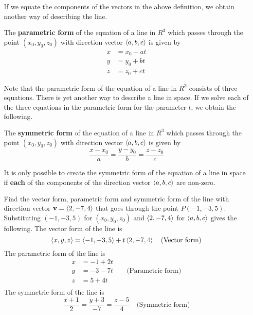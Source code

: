 \documentclass[handout]{ximera}
\begin{document}
If we equate the components of the vectors in the above definition, we obtain another way of describing the line.

\begin{definition}
The \textbf{parametric form} of the equation of a line in $R^3$ which passes through the point $(x_0, y_0, z_0)$ with 
direction vector $\left\langle a, b, c\right\rangle$ is given by
\begin{align*}
x &= x_0 + at\\
y &= y_0 + bt\\
z &= z_0 + ct
\end{align*}
\end{definition}
Note that the parametric form of the equation of a line in $R^3$ consists of three equations.
There is yet another way to describe a line in space. If we solve each of the three equations in the parametric form for the parameter $t$, 
we obtain the following.
\begin{definition}
The \textbf{symmetric form} of the equation of a line in $R^3$ which passes through the point $(x_0, y_0, z_0)$ with 
direction vector $\left\langle a, b, c\right\rangle$ is given by
\[
\frac{x-x_0}{a} = \frac{y-y_0}{b} = \frac{z-z_0}{c}
\]
\end{definition}
\begin{remark}
It is only possible to create the symmetric form of the equation of a line in space if \textbf{each} of the components of 
the direction vector $\left\langle a, b, c\right\rangle$ are non-zero.
\end{remark}


\begin{example}[Example 1]
Find the vector form, parametric form and symmetric form of the line with direction 
vector $\mathbf{v} = \left\langle 2, -7, 4\right\rangle$ that goes through the point $P(-1, -3, 5)$. \\
Substituting $(-1, -3, 5)$ for $(x_0, y_0, z_0)$ and $\left\langle 2, -7, 4\right\rangle$ for $\left\langle a,b,c\right\rangle$ gives the following.
The vector form of the line is 
\[
\left\langle x, y, z\right\rangle = \left\langle -1, -3, 5\right\rangle + t\left\langle 2, -7, 4\right\rangle \quad \text{(Vector form)}
\]
The parametric form of the line is
\begin{align*}
x &= -1 +2t\\
y &= -3 -7t \quad\quad \text{(Parametric form)}\\
z &= 5 + 4t\\
\end{align*}
The symmetric form of the line is
\[
\frac{x+1}{2} = \frac{y+3}{-7} = \frac{z-5}{4} \quad \text{(Symmetric form)}
\]
\end{example}
\end{document}
